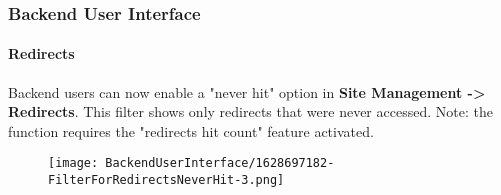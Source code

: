 %

\begin{frame}[fragile]
	\frametitle{Backend User Interface}
	\framesubtitle{Redirects}

	Backend users can now enable a "never hit" option in \textbf{Site Management -> Redirects}.
	This filter shows only redirects that were never accessed.\newline
	\small
		Note: the function requires the "redirects hit count" feature activated.
	\normalsize

	\begin{figure}
		\texttt{[image: BackendUserInterface/1628697182-FilterForRedirectsNeverHit-3.png]}
	\end{figure}

\end{frame}

